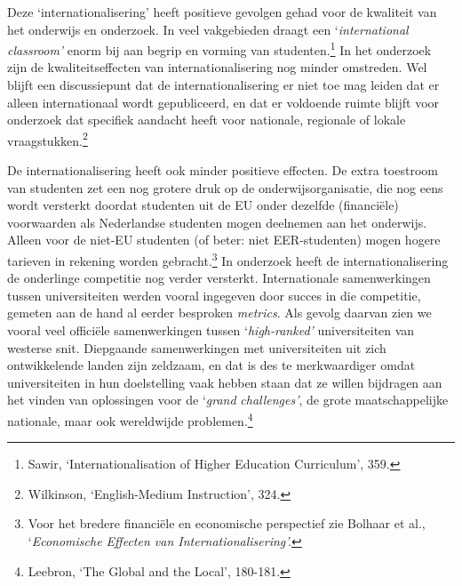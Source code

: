 \documentclass[smallauthor, chapterhaspagenum, nochapterinheader, pagenuminheader,  bigchapnum,medium2, tocpages, garamond, titleinheader]{jote-book}
\begin{document}
	Deze ‘internationalisering' heeft positieve gevolgen gehad voor de kwaliteit van het onderwijs en onderzoek. In veel vakgebieden draagt een ‘\emph{international}\emph{ classroom}\emph{'} enorm bij aan begrip en vorming van studenten.\footnote{Sawir, ‘Internationalisation of Higher Education Curriculum', 359. } In het onderzoek zijn de kwaliteitseffecten van internationalisering nog minder omstreden. Wel blijft een discussiepunt dat de internationalisering er niet toe mag leiden dat er alleen internationaal wordt gepubliceerd, en dat er voldoende ruimte blijft voor onderzoek dat specifiek aandacht heeft voor nationale, regionale of lokale vraagstukken.\footnote{Wilkinson, ‘English-Medium Instruction', 324. }



	De internationalisering heeft ook minder positieve effecten. De extra toestroom van studenten zet een nog grotere druk op de onderwijsorganisatie, die nog eens wordt versterkt doordat studenten uit de EU onder dezelfde (financiële) voorwaarden als Nederlandse studenten mogen deelnemen aan het onderwijs. Alleen voor de niet-EU studenten (of beter: niet EER-studenten) mogen hogere tarieven in rekening worden gebracht.\footnote{Voor het bredere financiële en economische perspectief zie Bolhaar et al., ‘\emph{Economische Effecten van Internationalisering}\emph{'.}} In onderzoek heeft de internationalisering de onderlinge competitie nog verder versterkt. Internationale samenwerkingen tussen universiteiten werden vooral ingegeven door succes in die competitie, gemeten aan de hand al eerder besproken \emph{metrics}. Als gevolg daarvan zien we vooral veel officiële samenwerkingen tussen ‘\emph{high-}\emph{ranked}\emph{'}\emph{ }universiteiten van westerse snit. Diepgaande samenwerkingen met universiteiten uit zich ontwikkelende landen zijn zeldzaam, en dat is des te merkwaardiger omdat universiteiten in hun doelstelling vaak hebben staan dat ze willen bijdragen aan het vinden van oplossingen voor de ‘\emph{grand }\emph{challenges}\emph{'}, de grote maatschappelijke nationale, maar ook wereldwijde problemen.\footnote{Leebron, ‘The Global and the Local', 180-181.}
\end{document}
